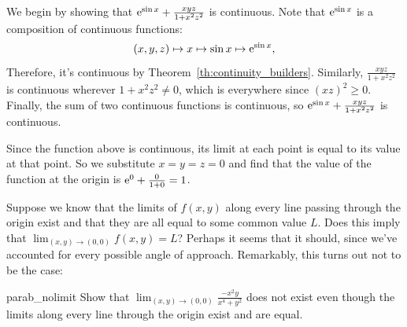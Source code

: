 \documentclass[prettycode,shellescape]{watsonbook}
\begin{document}
\begin{solution}
  We begin by showing that $\mathrm{e}^{\sin x} + \frac{xyz}{1 + x^2 z^2}$ is
  continuous.  Note that $\mathrm{e}^{\sin x}$ is a composition of continuous
  functions: 
  \[
    (x,y,z) \mapsto x \mapsto \sin x \mapsto \mathrm{e}^{\sin x}, 
  \]
  Therefore, it's continuous by Theorem~\ref{th:continuity_builders}. Similarly,
  $\frac{xyz}{1 + x^2 z^2}$ is continuous wherever $1 + x^2 z^2 \neq
  0$, which is everywhere since $(xz)^2 \geq 0$. Finally, the sum of
  two continuous functions is continuous, so $\mathrm{e}^{\sin x} +
  \frac{xyz}{1 + x^2 z^2}$ is continuous.

  Since the function above is continuous, its limit at each point is
  equal to its value at that point. So we substitute $x=y=z=0$ and
  find that the value of the function at the origin is
  $\mathrm{e}^0 + \frac{0}{1+0} = 1$.
\end{solution}

Suppose we know that the limits of $f(x,y)$ along every line
passing through the origin exist and that they are all equal to some
common value $L$. Does this imply that
$\lim_{(x,y) \to (0,0)}f(x,y) = L$? Perhaps it seems that it should,
since we've accounted for every possible angle of
approach. Remarkably, this turns out not to be the case:

\begin{example}{}{parab_nolimit}
  Show that $\lim_{(x,y) \to (0,0)}\frac{-x^2 y }{x^4 + y^2}$ does not
  exist even though the limits along every line through the origin
  exist and are equal. 
\end{example}
\end{document}
